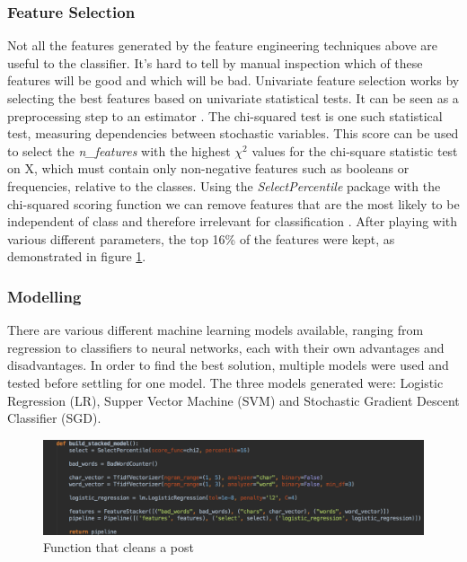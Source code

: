 \subsubsection{Feature Selection}
Not all the features generated by the feature engineering techniques above are useful to the classifier. It's hard to tell by manual inspection which of these features will be good and which will be bad. Univariate feature selection works by selecting the best features based on univariate statistical tests. It can be seen as a preprocessing step to an estimator \cite{Scikit:FeatureSelection}. The chi-squared test is one such statistical test, measuring dependencies between stochastic variables. This score can be used to select the \emph{n\_features} with the highest $\chi^2$ values for the chi-square statistic test on X, which must contain only non-negative features such as booleans or frequencies, relative to the classes. Using the \textit{SelectPercentile} package with the chi-squared scoring function we can remove features that are the most likely to be independent of class and therefore irrelevant for classification \cite{Scikit:SelectPercentile, Scikit:ChiSquared}. After playing with various different parameters, the top 16\% of the features were kept, as demonstrated in figure \ref{fig:AbuseDetection-Modelling}.

\subsubsection{Modelling}
There are various different machine learning models available, ranging from regression to classifiers to neural networks, each with their own advantages and disadvantages. In order to find the best solution, multiple models were used and tested before settling for one model. The three models generated were: Logistic Regression (LR), Supper Vector Machine (SVM) and Stochastic Gradient Descent Classifier (SGD).

\begin{figure}[H]
    \centering
    \includegraphics[width=\textwidth]{Images/Implementation/DataProcessing/AbuseDetection/Modelling}
    \caption{Function that cleans a post}
    \label{fig:AbuseDetection-Modelling}
\end{figure}

